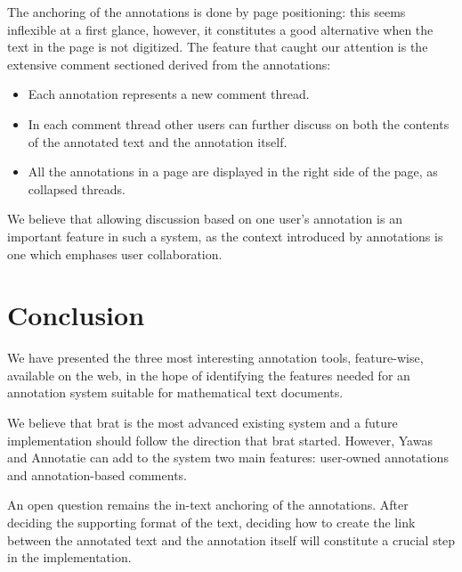 \documentclass[11pt]{bluenote}
\begin{document}
The anchoring of the annotations is done by page positioning: this seems inflexible at a first glance, however, it constitutes a good alternative when the text in the page is not digitized.
The feature that caught our attention is the extensive comment sectioned derived from the annotations:
\begin{itemize}
 \item Each annotation represents a new comment thread.
 \item In each comment thread other users can further discuss on both the contents of the annotated text and the annotation itself.
 \item All the annotations in a page are displayed in the right side of the page, as collapsed threads.
\end{itemize}
We believe that allowing discussion based on one user's annotation is an important feature in such a system, as the context introduced by annotations is one which emphases user collaboration.
 
\section{Conclusion} %
We have presented the three most interesting annotation tools, feature-wise, available on the web, in the hope of identifying the features needed for an annotation system suitable for
mathematical text documents.\vspace{10pt}

We believe that brat is the most advanced existing system and a future implementation should follow the direction that brat started. However, Yawas and Annotatie can add to the system two
main features: user-owned annotations and annotation-based comments.\vspace{10pt} 

An open question remains the in-text anchoring of the annotations. After deciding the supporting format of the text, deciding how to create the link between the annotated text and the 
annotation itself will constitute a crucial step in the implementation.
 

\end{document}
